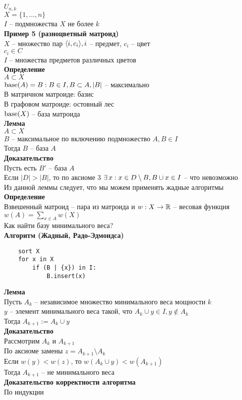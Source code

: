 \documentclass[12pt]{article}
\begin{document}
$U_{n,k}$\\
$X = \{1, \ldots, n\}$\\
$I$ -- подмножества $X$ не более $k$\\
\textbf{Пример 5 (разноцветный матроид)}\\
$X$ -- множество пар $\langle i, c_i \rangle, i$ -- предмет, $c_i$ -- цвет\\
$c_i \in C$\\
$I$ -- множества предметов различных цветов\\
\textbf{Определение}\\
$A \subset X$\\
$\operatorname{base}(A) = B: B\in I, B \subset A, |B|$ -- максимально\\
В матричном матроиде: базис\\
В графовом матроиде: остовный лес\\
$\operatorname{base}(X)$ -- база матроида\\
\textbf{Лемма}\\
$A \subset X$\\
$B$ -- максимальное по включению подмножество $A, B \in I$\\
Тогда $B$ -- база $A$\\
\textbf{Доказательство}\\
Пусть есть $B'$ -- база $A$\\
Если $|D| > |B|$, то по аксиоме 3 $\exists\, x: x \in D\setminus B, B \cup x \in I$ -- что невозможно\\
Из данной леммы следует, что мы можем применять жадные алгоритмы\\
\textbf{Определение}\\
Взвешенный матроид -- пара из матроида и $w: X \rightarrow \mathbb{R}$ -- весовая функция\\
$w(A) = \sum_{x\in A}w(X)$\\
Как найти базу минимального веса?\\
\textbf{Алгоритм (Жадный, Радо-Эдмондса)}
\begin{lstlisting}
    sort X
    for x in X
        if (B | {x}) in I:
            B.insert(x)
\end{lstlisting}
\textbf{Лемма}\\
Пусть $A_k$ -- независимое множество минимального веса мощности $k$\\
$y$ -- элемент минимального веса такой, что $A_k \cup y \in I, y\not\in A_k$\\
Тогда $A_{k+1} := A_k \cup y$\\
\textbf{Доказательство}\\
Рассмотрим $A_k$ и $A_{k+1}$\\
По аксиоме замены $z = A_{k+1} \setminus A_k$\\
Если $w(y) < w(z)$, то $w(A_k \cup y) < w(A_{k+1})$\\
Тогда $A_{k+1}$ -- не минимального веса\\
\textbf{Доказательство корректности алгоритма}\\
По индукции\\
\end{document}
